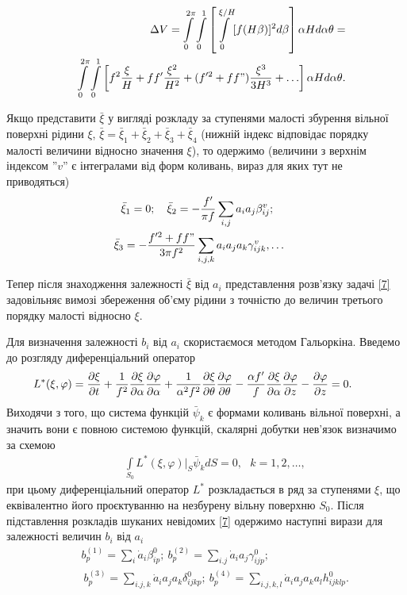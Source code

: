 \documentclass[11pt, reqno]{amsart}
\begin{document}
\begin{eqnarray*}
    &&\Delta V =\int \limits_0^{2\pi} \int \limits_0^1 \left [ \int \limits_0^{\xi/H} [f(H\beta)]^2 d\beta  \right ] \alpha H d\alpha \theta=\\
    &&\int \limits_0^{2\pi} \int \limits_0^1 \left [f^2 \frac{\xi}{H} +ff'\frac{\xi^2}{H^2}+(f'^2 +ff") \frac{\xi^3}{3H^3}+ \ldots \right ] \alpha H d\alpha \theta.
\end{eqnarray*}

Якщо представити $\bar \xi$ у вигляді розкладу за ступенями малості збурення вільної поверхні рідини $\xi$, $\bar \xi = \bar \xi_1 +\bar \xi_2 + \bar \xi_3 +\bar \xi_4 $ (нижній індекс відповідає порядку малості величини відносно значення $\xi$), то одержимо (величини з верхнім індексом ''$v$'' є інтегралами від форм коливань, вираз для яких тут не приводяться)
\begin{eqnarray}\label{8}
    &&\hskip-8mm\bar \xi_1=0; \ \ \ \bar \xi_2=-\frac{f'}{\pi f} \sum_{i,j} a_i a_j \beta_{ij}^v; \ \ \ \\
    &&\hskip-8mm \bar \xi_3=-\frac{f'^2+ff"}{3\pi f^2} \sum_{i,j,k} a_i a_j a_k \gamma_{ijk}^v, \ldots \nonumber
\end{eqnarray}

Тепер після знаходження залежності $\bar \xi$ від $a_i$ представлення розв'язку задачі \eqref{7} задовільняє вимозі збереження об'єму рідини з точністю до величин третього порядку малості відносно $\xi$.

Для визначення залежності $b_i$ від $a_i$ скористаємося методом Гальоркіна. Введемо до розгляду диференціальний оператор
\begin{eqnarray*}
    &&\hskip-12mm L^*(\xi, \varphi) = \displaystyle \frac{\partial \xi}{\partial t} +\frac{1}{f^2} \frac{\partial \xi}{\partial \alpha} \frac{\partial \varphi }{\partial \alpha} +\frac{1}{\alpha^2 f^2} \frac{\partial \xi}{\partial \theta} \frac{\partial \varphi }{\partial \theta}-\frac{\alpha f'}{f} \frac{\partial \xi}{\partial \alpha} \frac{\partial \varphi }{\partial z} - \frac{\partial \varphi }{\partial z}=0.
\end{eqnarray*}
Виходячи з того, що система функцій $\bar \psi_k$ є формами коливань вільної поверхні, а значить вони є повною системою функцій, скалярні добутки нев'язок визначимо за схемою
\begin{eqnarray*}
     &&\int \limits_{S_0} L^*(\xi, \varphi) \big |_S \bar \psi_k dS=0, \ \ \ k=1, 2, \ldots ,
\end{eqnarray*}
при цьому диференціальний оператор $L^*$ розкладається в ряд за ступенями  $\xi$, що еквівалентно його проєктуванню на незбурену вільну поверхню $S_0$. Після підставлення розкладів шуканих невідомих \eqref{7} одержимо наступні вирази для залежності величин $b_i$ від $a_i$
\begin{eqnarray}\label{9}
    &&b_p^{(1)}=\sum_i \dot a_i\beta_{ip}^0; \ b_p^{(2)}=\sum_{i.j} \dot a_i a_j\gamma_{ijp}^0;\\
    &&\  b_p^{(3)}=\sum_{i.j,k} \dot a_i a_j a_k \delta_{ijkp}^0; \
         b_p^{(4)}=\sum_{i.j,k,l} \dot a_i a_j a_k a_l h_{ijklp}^0.\nonumber
\end{eqnarray}
\end{document}
